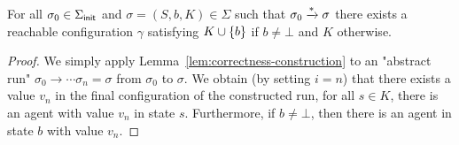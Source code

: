 \begin{corollary}
	For all $\sigma_0 \in \Sigma_{\mathsf{init}}$ and $\sigma = (S, b, K) \in \Sigma$ such that $\sigma_0 \xrightarrow{*} \sigma$ there exists a reachable configuration $\gamma$ satisfying $K \cup \{b\}$ if $b \neq \bot$ and $K$ otherwise.
\end{corollary}

\begin{proof}
	We simply apply Lemma~\ref{lem:correctness-construction} to an "abstract run" $\sigma_0 \to \cdots \sigma_n = \sigma$ from $\sigma_0$ to $\sigma$.
	We obtain (by setting $i = n$) that there exists a value $v_n$ in the final configuration of the constructed run, for all $s \in K$, there is an agent with value $v_n$ in state $s$. Furthermore, if $b \neq \bot$, then there is an agent in state $b$ with value $v_n$.  
\end{proof}